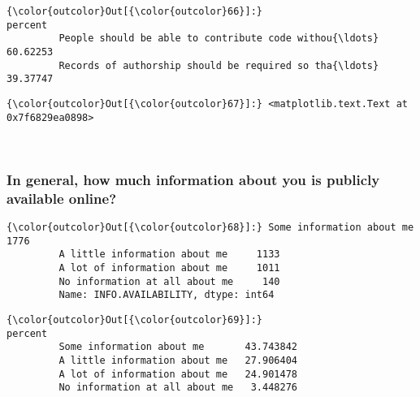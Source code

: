 \documentclass[11pt]{article}
\begin{document}
            \begin{Verbatim}[commandchars=\\\{\}]
{\color{outcolor}Out[{\color{outcolor}66}]:}                                                      percent
         People should be able to contribute code withou{\ldots}  60.62253
         Records of authorship should be required so tha{\ldots}  39.37747
\end{Verbatim}
        

            \begin{Verbatim}[commandchars=\\\{\}]
{\color{outcolor}Out[{\color{outcolor}67}]:} <matplotlib.text.Text at 0x7f6829ea0898>
\end{Verbatim}
        
    \begin{center}
    \end{center}
    { \hspace*{\fill} \\}
    
    \subsubsection{In general, how much information about you is publicly
available
online?}\label{in-general-how-much-information-about-you-is-publicly-available-online}


            \begin{Verbatim}[commandchars=\\\{\}]
{\color{outcolor}Out[{\color{outcolor}68}]:} Some information about me         1776
         A little information about me     1133
         A lot of information about me     1011
         No information at all about me     140
         Name: INFO.AVAILABILITY, dtype: int64
\end{Verbatim}
        

            \begin{Verbatim}[commandchars=\\\{\}]
{\color{outcolor}Out[{\color{outcolor}69}]:}                                   percent
         Some information about me       43.743842
         A little information about me   27.906404
         A lot of information about me   24.901478
         No information at all about me   3.448276
\end{Verbatim}
        
\end{document}
